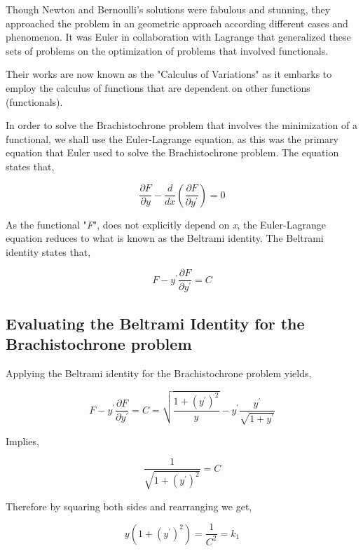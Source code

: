 

{Though Newton and Bernoulli's solutions were fabulous and stunning, they approached the problem in an geometric approach according different cases and phenomenon. It was Euler in collaboration with Lagrange that generalized these sets of problems on the optimization of problems that involved functionals.}

{Their works are now known as the "Calculus of Variations" as it embarks to employ the calculus of functions that are dependent on other functions (functionals).}

{In order to solve the Brachistochrone problem that involves the minimization of a functional, we shall use the Euler-Lagrange equation, as this was the primary equation that Euler used to solve the Brachistochrone problem. The equation states that,}

	$$\frac{\partial F}{\partial y} - \frac{d}{dx}\left(\frac{\partial F}{\partial y^{\prime}}\right) = 0$$

{As the functional "\textit{F}", does not explicitly depend on \textit{x}, the Euler-Lagrange equation reduces to what is known as the Beltrami identity. The Beltrami identity states that,}

	$$F - y^{\prime}\frac{\partial F}{\partial y^{\prime}} = C$$



\subsection{Evaluating the Beltrami Identity for the Brachistochrone problem}

	{Applying the Beltrami identity for the Brachistochrone problem yields,}

		$$F - y^{\prime}\frac{\partial F}{\partial y^{\prime}} = C = \sqrt{\frac{1 + \left(y^{\prime}\right)^2}{y}} - y^{\prime}\frac{y^{\prime}}{\sqrt{1 + y^{\prime}}}$$

	{Implies,}

		$$\frac{1}{\sqrt{1 + \left(y^{\prime}\right)^2}} = C$$

	{Therefore by squaring both sides and rearranging we get,}

		$$y\left(1 + \left(y^{\prime}\right)^2\right) = \frac{1}{C^2} = k_{1}$$

